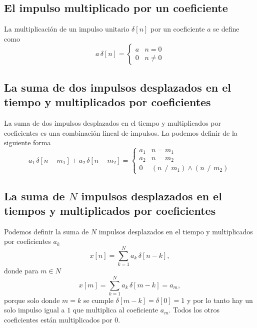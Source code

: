 \subsection{El impulso multiplicado por un coeficiente}

La multiplicaci\'{o}n de un impulso unitario $\delta[n]$ por un
coeficiente $a$ se define como
\begin{equation}
a \, \delta[n] = \left\{ \begin{array}{cc}
      a & n = 0\\
      0 & n \neq 0 \end{array} 
  \right.
\end{equation}

\subsection{La suma de dos impulsos desplazados en el tiempo y
  multiplicados por coeficientes}

La suma de dos impulsos desplazados en el tiempo y multiplicados por
coeficientes es una combinaci\'{o}n lineal de impulsos. La podemos
definir de la siguiente forma
\begin{equation}
a_{1} \, \delta[n - m_{1}] + 
a_{2} \, \delta[n - m_{2}] = \left\{ \begin{array}{cc}
      a_{1} & n = m_{1}\\
      a_{2} & n = m_{2}\\
      0 & (n \neq m_{1}) \wedge (n \neq m_{2})  \end{array} 
  \right.
\end{equation}


\subsection{La suma de $N$ impulsos desplazados en el tiempos y
  multiplicados por coeficientes}

Podemos definir la suma de $N$ impulsos desplazados en el tiempo y multiplicados por
coeficientes $a_{k}$
\begin{equation}
x[n] = \sum_{k = 1}^{N} a_{k} \, \delta[n - k],
\end{equation}
donde para $m \in N$
\begin{equation}
x[m] = \sum_{k = 1}^{N} a_{k} \, \delta[m - k] = a_{m},
\end{equation}
porque solo donde $m = k$ se cumple $\delta[m - k] = \delta[0] = 1$ y por lo tanto hay un solo impulso igual a $1$ que multiplica al coeficiente $a_{m}$. Todos los otros coeficientes están multiplicados por $0$.

